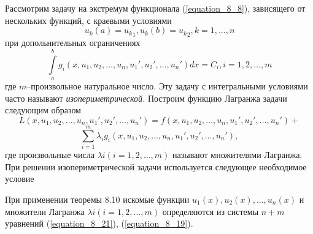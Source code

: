 	Рассмотрим задачу на экстремум функционала (\ref{equation_8_8}), зависящего от нескольких функций, с краевыми условиями
	\begin{equation}
	\label{equation_8_18}
		 u_k(a)={u_k}_1, u_k(b)={u_k}_2, k=1,\ldots, n
	\end{equation}
	при допольнительных ограничениях
	\begin{equation}
	\label{equation_8_19}
		\textstyle \int\limits_a^b g_i(x,u_1, u_2, \ldots, u_n, u_1', u_2', \ldots, u_n')dx = C_i, i = 1, 2, \ldots, m
	\end{equation}
	где $m$–произвольное натуральное число. Эту задачу с интегральными условиями часто называют {\it изопериметрической.} Построим функцию Лагранжа задачи следующим образом
	$$L(x,u_1, u_2, \ldots, u_n, u_1', u_2', \ldots, u_n') = f(x,u_1, u_2, \ldots, u_n, u_1', u_2', \ldots, u_n')+ $$
	\begin{equation}
	\label{equation_8_20}
	 	\sum_{i=1}^{m} \lambda_i g_i(x,u_1, u_2, \ldots, u_n, u_1', u_2', \ldots, u_n'),
	\end{equation}
	где произвольные числа $\lambda i (i=1, 2,\ldots, m)$ называют множителями Лагранжа. При решении изопериметрической задачи используется следующее необходимое условие

	При применении теоремы 8.10 искомые функции $u_1(x), u_2(x), \ldots, u_n(x)$ и множители Лагранжа $\lambda i (i=1, 2,\ldots, m)$ определяются из системы $n+m$ уравнений (\ref{equation_8_21}), (\ref{equation_8_19}).


